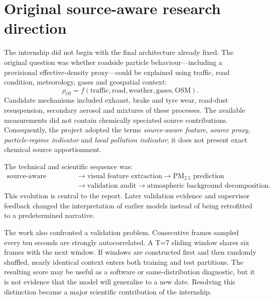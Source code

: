 \documentclass[11pt,a4paper,oneside]{report}
\newcommand{\pmtwo}{PM$_{2.5}$}
\begin{document}
\section{Original source-aware research direction}
The internship did not begin with the final architecture already fixed. The
original question was whether roadside particle behaviour---including a
provisional effective-density proxy---could be explained using traffic, road
condition, meteorology, gases and geospatial context:
\begin{equation}
  \rho_{\mathrm{eff}} =
  f(\mathrm{traffic},\mathrm{road},\mathrm{weather},\mathrm{gases},\mathrm{OSM}).
\end{equation}
Candidate mechanisms included exhaust, brake and tyre wear, road-dust
resuspension, secondary aerosol and mixtures of these processes. The available
measurements did not contain chemically speciated source contributions.
Consequently, the project adopted the terms \emph{source-aware feature},
\emph{source proxy}, \emph{particle-regime indicator} and \emph{local pollution
indicator}; it does not present exact chemical source apportionment.

The technical and scientific sequence was:
\begin{align*}
\text{source-aware modelling}
&\rightarrow \text{visual feature extraction}
\rightarrow \text{\pmtwo\ prediction}\\
&\rightarrow \text{validation audit}
\rightarrow \text{atmospheric background decomposition}.
\end{align*}
This evolution is central to the report. Later validation evidence and
supervisor feedback changed the interpretation of earlier models instead of
being retrofitted to a predetermined narrative.

The work also confronted a validation problem. Consecutive frames sampled every ten
seconds are strongly autocorrelated. A T=7 sliding window shares six frames with the
next window. If windows are constructed first and then randomly shuffled, nearly
identical context enters both training and test partitions. The resulting score may
be useful as a software or same-distribution diagnostic, but it is not evidence that
the model will generalise to a new date. Resolving this distinction became a major
scientific contribution of the internship.
\end{document}
